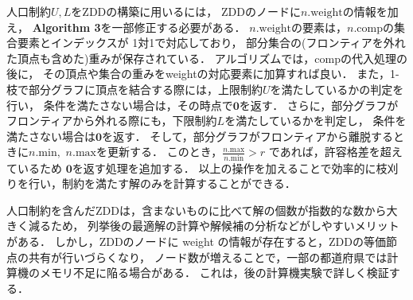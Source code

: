 人口制約$U,L$をZDDの構築に用いるには，
ZDDのノードに$n.\mathrm{weight}$の情報を加え，
\textbf{Algorithm 3}を一部修正する必要がある．
$n.\mathrm{weight}$の要素は，$n.\mathrm{comp}$の集合要素とインデックスが
1対1で対応しており，
部分集合の(フロンティアを外れた頂点も含めた)重みが保存されている．
アルゴリズムでは，compの代入処理の後に，
その頂点や集合の重みをweightの対応要素に加算すれば良い．
また，1-枝で部分グラフに頂点を結合する際には，上限制約$U$を満たしているかの判定を行い，
条件を満たさない場合は，その時点で$\textbf{0}$を返す．
さらに，部分グラフがフロンティアから外れる際にも，下限制約$L$を満たしているかを判定し，
条件を満たさない場合は$\textbf{0}$を返す．
そして，部分グラフがフロンティアから離脱するときに$n.\mathrm{min}, $ $n.\mathrm{max}$を更新する．
このとき，$\frac{n.\mathrm{max}}{n.\mathrm{min}} > r$ であれば，許容格差を超えているため
$\textbf{0}$を返す処理を追加する．
以上の操作を加えることで効率的に枝刈りを行い，制約を満たす解のみを計算することができる．

人口制約を含んだZDDは，含まないものに比べて解の個数が指数的な数から大きく減るため，
列挙後の最適解の計算や解候補の分析などがしやすいメリットがある．
しかし，ZDDのノードに weight の情報が存在すると，ZDDの等価節点の共有が行いづらくなり，
ノード数が増えることで，一部の都道府県では計算機のメモリ不足に陥る場合がある．
これは，後の計算機実験で詳しく検証する．